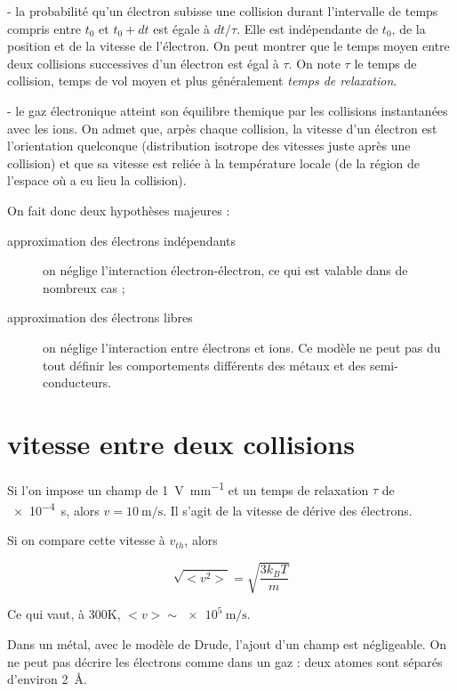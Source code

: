 - la probabilité qu'un électron subisse une collision durant l'intervalle de temps compris entre $t_0$ et $t_0 + dt$ est égale à $dt/\tau$. Elle est indépendante de $t_0$, de la position et de la vitesse de l'électron. On peut montrer que le temps moyen entre deux collisions successives d'un électron est égal à $\tau$. On note $\tau$ le temps de collision, temps de vol moyen et plus généralement \emph{temps de relaxation}.

- le gaz électronique atteint son équilibre themique par les collisions instantanées avec les ions. On admet que, arpès chaque collision, la vitesse d'un électron est l'orientation quelconque (distribution isotrope des vitesses juste après une collision) et que sa vitesse est reliée à la température locale (de la région de l'espace où a eu lieu la collision).

On fait donc deux hypothèses majeures :
\begin{description}
\item[approximation des électrons indépendants] on néglige l'interaction électron-électron, ce qui est valable dans de nombreux cas ;
\item[approximation des électrons libres] on néglige l'interaction entre électrons et ions. Ce modèle ne peut pas du tout définir les comportements différents des métaux et des semi-conducteurs.
\end{description}

\TODO

\section{vitesse entre deux collisions}

Si l'on impose un champ de \SI{1}{\volt\per\milli\metre} et un temps de relaxation $\tau$ de \SI{e-4}{\second}, alors $v = \SI{10}{\metre\per\second}$. Il s'agit de la vitesse de dérive des électrons.

Si on compare cette vitesse à $v_{th}$, alors

\begin{equation}
\sqrt{<v^2>} = \sqrt{\frac{3k_BT}{m}}
\end{equation}

Ce qui vaut, à 300K, $<v> \sim \SI{e5}{\metre\per\second}$.

Dans un métal, avec le modèle de Drude, l'ajout d'un champ est négligeable. On ne peut pas décrire les électrons comme dans un gaz :
deux atomes sont séparés d'environ \SI{2}{\angstrom}.

